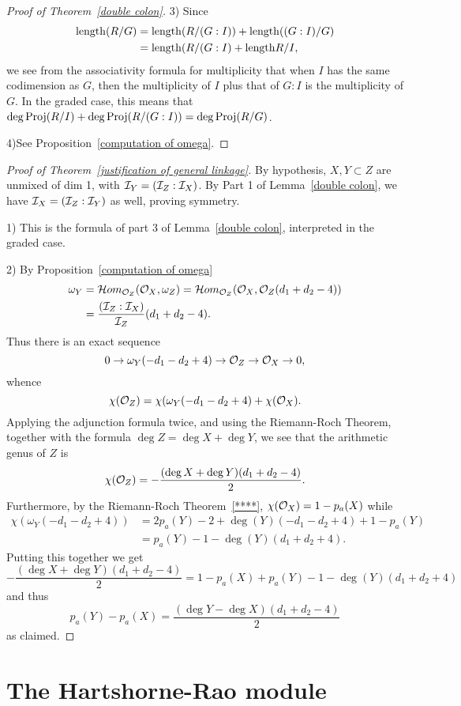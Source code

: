 \begin{proof}[Proof of Theorem~\ref{double colon}]
3) Since 
\begin{align*}
 {\rm length} (R/G) &= {\rm length}(R/(G:I))+{\rm length}((G:I)/G)\\
 &= {\rm length}(R/(G:I) +{\rm length} R/I,
\end{align*}
we see from the associativity formula for multiplicity that when $I$ has the same codimension as $G$, then the multiplicity of $I$ plus that of $G:I$ is the multiplicity of $G$. In the graded case, this means that
$\deg \operatorname{Proj}(R/I) +\deg \operatorname{Proj}(R/(G:I)) = \deg \operatorname{Proj}(R/G)$.

4)See Proposition~\ref{computation of omega}.
\end{proof}

 \begin{proof}[Proof of Theorem~\ref{justification of general linkage}]
 By hypothesis, 
$X,Y\subset Z$ are unmixed of dim 1, with ${\mathcal I}_{Y} = ({\mathcal I}_Z:{\mathcal I}_X)$. By Part 1 of Lemma~\ref{double colon}, we have
${\mathcal I}_{X} = ({\mathcal I}_Z:{\mathcal I}_Y)$ as well, proving symmetry.

1) This is  the formula of part 3 of Lemma~\ref{double colon}, interpreted in the graded case.

2)  By Proposition~\ref{computation of omega}
\begin{align*}
 \omega_{Y} &= \mathcal{H}om_{{\mathcal O}_Z}({\mathcal O}_X, \omega_Z) = 
\mathcal{H}om_{{\mathcal O}_Z}({\mathcal O}_X, {\mathcal O}_Z(d_1+d_2-4))\\
&=  \frac{({\mathcal I}_Z:{\mathcal I}_X)}{{\mathcal I}_{Z}}(d_1+d_2-4).
\end{align*}
Thus there is an exact sequence
$$
0\to \omega_{Y}(-d_1-d_2+4) \to {\mathcal O}_Z \to {\mathcal O}_X \to 0,
$$
whence
$$
 \chi({\mathcal O}_Z) =
 \chi(\omega_{Y}(-d_1-d_2+4) +
 \chi({\mathcal O}_X).
 $$
 Applying the adjunction formula twice, and using the Riemann-Roch Theorem, together with the formula
 $\deg Z = \deg X + \deg Y$, we see that the arithmetic genus of $Z$ is
 $$
 \chi({\mathcal O}_Z) = -\frac{(\deg X + \deg Y)(d_1+d_2-4)}{2}.
 $$
Furthermore, by the Riemann-Roch Theorem~\ref{****}, $\chi({\mathcal O}_X) = 1-p_a(X)$ while
\begin{align*}
\chi(\omega_{Y}(-d_1-d_2+4)) &= 2p_a(Y) -2 + \deg(Y)(-d_1-d_2+4) + 1- p_a(Y)\\
&= p_a(Y)-1- \deg(Y)(d_1+d_2+4).
\end{align*}
Putting this together we get
$$
-\frac{(\deg X+\deg Y)(d_1+d_2-4)}{2} = 1-p_a(X) + p_a(Y)-1 - \deg(Y)(d_1+d_2+4)
$$
and thus 
$$
p_a(Y) -p_a(X) = \frac{(\deg Y-\deg X)(d_1+d_2-4)}{2}
$$
as claimed.
 \end{proof}

\section{The Hartshorne-Rao module}

